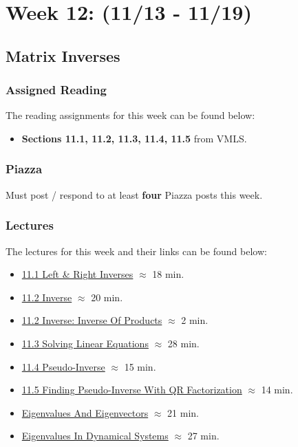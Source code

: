 \clearpage
\chapter{Week 12: (11/13 - 11/19)}

\section{Matrix Inverses}

\subsection{Assigned Reading}

The reading assignments for this week can be found below:

\begin{itemize}
    \item \textbf{Sections 11.1, 11.2, 11.3, 11.4, 11.5} from VMLS.
\end{itemize}

\subsection{Piazza}

Must post / respond to at least \textbf{four} Piazza posts this week.  

\subsection{Lectures}

The lectures for this week and their links can be found below:

\begin{itemize}
    \item \href{https://applied.cs.colorado.edu/mod/hvp/view.php?id=50802}{11.1 Left \& Right Inverses} $\approx$ 18 min.
    \item \href{https://applied.cs.colorado.edu/mod/hvp/view.php?id=50803}{11.2 Inverse} $\approx$ 20 min.
    \item \href{https://applied.cs.colorado.edu/mod/hvp/view.php?id=50804}{11.2 Inverse: Inverse Of Products} $\approx$ 2 min.
    \item \href{https://applied.cs.colorado.edu/mod/hvp/view.php?id=50805}{11.3 Solving Linear Equations} $\approx$ 28 min.
    \item \href{https://applied.cs.colorado.edu/mod/hvp/view.php?id=50806}{11.4 Pseudo-Inverse} $\approx$ 15 min.
    \item \href{https://applied.cs.colorado.edu/mod/hvp/view.php?id=50807}{11.5 Finding Pseudo-Inverse With QR Factorization} $\approx$ 14 min.
    \item \href{https://applied.cs.colorado.edu/mod/hvp/view.php?id=50808}{Eigenvalues And Eigenvectors} $\approx$ 21 min.
    \item \href{https://applied.cs.colorado.edu/mod/hvp/view.php?id=50809}{Eigenvalues In Dynamical Systems} $\approx$ 27 min.
\end{itemize}


